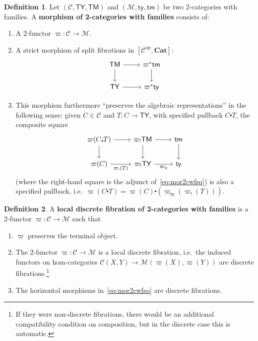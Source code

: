 \documentclass[10pt]{article}
\theoremstyle{definition}
\newtheorem{definition}{Definition}
\newcommand\op{^{\mathrm{op}}}
\newcommand\Cat{\mathbf{Cat}}
\newcommand\M{\mathcal{M}}
\newcommand\Mty{\mathsf{ty}}
\newcommand\Mtm{\mathsf{tm}}
\newcommand\C{\mathcal{C}}
\newcommand\Cty{\mathsf{TY}}
\newcommand\Ctm{\mathsf{TM}}
\newcommand\vp{\varpi}
\newcommand\vpst{\vp^*}
\newcommand\vpsh{\vp_!}
\newcommand\vpty{{\vp}_{\mathsf{ty}}}
\newcommand\ce{\mathord{\centerdot}}
\begin{document}
\begin{definition}\label{defn:mor-2cwu}
  Let $(\C,\Cty,\Ctm)$ and $(\M,\Mty,\Mtm)$ be two 2-categories with families.
  A \textbf{morphism of 2-categories with families} consists of:
  \begin{enumerate}
  \item A 2-functor $\vp:\C\to\M$.
  \item A strict morphism of split fibrations in $[\C\op,\Cat]$:
    \begin{equation}
      \begin{tikzcd}
        \Ctm \ar[d] \ar[r] & \vpst \Mtm \ar[d] \\
        \Cty \ar[r] & \vpst \Mty
      \end{tikzcd}\label{eq:mor2cwfsq}
    \end{equation}
  \item This morphism furthermore ``preserves the algebraic representations'' in the following sense: given $C\in \C$ and $T:C \to \Cty$, with specified pullback $C\ce T$, the composite square
    \begin{equation}
      \begin{tikzcd}
        \vp(C\ce T) \ar[r] \ar[d] & \vpsh \Ctm \ar[r] \ar[d] & \Mtm \ar[d]\\
        \vp(C) \ar[r,"\vpsh(T)"'] & \vpsh \Cty \ar[r,"{\vpty}"'] & \Mty
      \end{tikzcd}\label{eq:mor-presrep}
    \end{equation}
    (where the right-hand square is the adjunct of~\eqref{eq:mor2cwfsq})
    is also a specified pullback, i.e.\ $\vp(C\ce T) = \vp(C)\ce(\vpty(\vpsh(T)))$.
  \end{enumerate}
\end{definition}

\begin{definition}\label{thm:2cwf-ldf}
  A \textbf{local discrete fibration of 2-categories with families} is a 2-functor $\vp : \C\to\M$ such that
  \begin{enumerate}
  \item $\vp$ preserves the terminal object.
  \item The 2-functor $\vp:\C\to\M$ is a local discrete fibration, i.e.\ the induced functors on hom-categories $\C(X,Y) \to \M(\vp(X),\vp(Y))$ are discrete fibrations.\footnote{If they were non-discrete fibrations, there would be an additional compatibility condition on composition, but in the discrete case this is automatic.}\label{item:ldf1}
  \item The horizontal morphisms in~\eqref{eq:mor2cwfsq} are discrete fibrations.\label{item:ldf2}
  \end{enumerate}
\end{definition}
\end{document}
